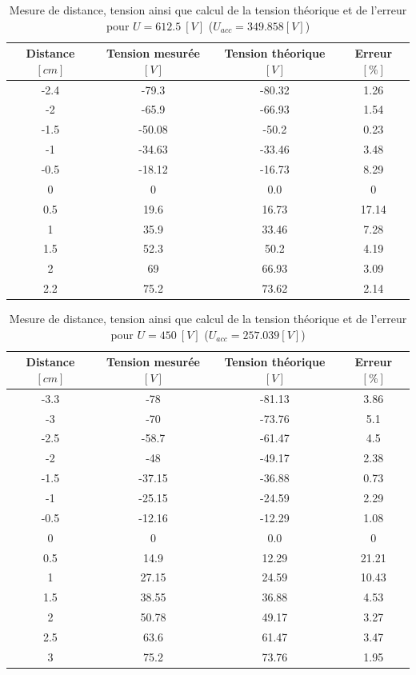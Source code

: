 \documentclass[11pt]{article}
\begin{document}
\begin{table}[H]
\center
\begin{tabular}{|c|>{\columncolor{lightgray}}c|c|>{\columncolor{lightgray}}c|}
\hline
\rowcolor{gray} Distance $[cm]$ & Tension mesurée $[V]$ & Tension théorique $[V]$ & Erreur $[\%]$ \\ \hline
-2.4 & -79.3 & -80.32 & 1.26 \\ \hline
-2 & -65.9 & -66.93 & 1.54 \\ \hline
-1.5 & -50.08 & -50.2 & 0.23 \\ \hline
-1 & -34.63 & -33.46 & 3.48 \\ \hline
-0.5 & -18.12 & -16.73 & 8.29 \\ \hline
0 & 0 & 0.0 & 0 \\ \hline
0.5 & 19.6 & 16.73 & 17.14 \\ \hline
1 & 35.9 & 33.46 & 7.28 \\ \hline
1.5 & 52.3 & 50.2 & 4.19 \\ \hline
2 & 69 & 66.93 & 3.09 \\ \hline
2.2 & 75.2 & 73.62 & 2.14 \\ \hline
\end{tabular}
\caption{Mesure de distance, tension ainsi que calcul de la tension théorique et de l'erreur pour $U=612.5 \ [V]$ ($U_{acc} = 349.858 [V]$)}
\label{table:u_612}
\end{table}

\begin{table}[H]
\center
\begin{tabular}{|c|>{\columncolor{lightgray}}c|c|>{\columncolor{lightgray}}c|}
\hline
\rowcolor{gray} Distance $[cm]$ & Tension mesurée $[V]$ & Tension théorique $[V]$ & Erreur $[\%]$ \\ \hline
-3.3 & -78 & -81.13 & 3.86 \\ \hline
-3 & -70 & -73.76 & 5.1 \\ \hline
-2.5 & -58.7 & -61.47 & 4.5 \\ \hline
-2 & -48 & -49.17 & 2.38 \\ \hline
-1.5 & -37.15 & -36.88 & 0.73 \\ \hline
-1 & -25.15 & -24.59 & 2.29 \\ \hline
-0.5 & -12.16 & -12.29 & 1.08 \\ \hline
0 & 0 & 0.0 & 0 \\ \hline
0.5 & 14.9 & 12.29 & 21.21 \\ \hline
1 & 27.15 & 24.59 & 10.43 \\ \hline
1.5 & 38.55 & 36.88 & 4.53 \\ \hline
2 & 50.78 & 49.17 & 3.27 \\ \hline
2.5 & 63.6 & 61.47 & 3.47 \\ \hline
3 & 75.2 & 73.76 & 1.95 \\ \hline
\end{tabular}
\caption{Mesure de distance, tension ainsi que calcul de la tension théorique et de l'erreur pour $U=450 \ [V]$ ($U_{acc} = 257.039 [V]$)}
\label{table:u_450}
\end{table}
\end{document}
